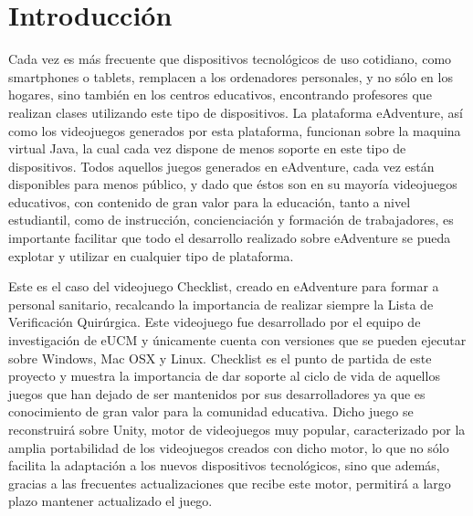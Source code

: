 
\cleardoublepage


\chapter{Introducción}
\label{introduccion}

Cada vez es más frecuente que dispositivos tecnológicos de uso cotidiano, como smartphones o tablets, remplacen a los ordenadores personales, y no sólo en los hogares, sino también en los centros educativos, encontrando profesores que realizan clases utilizando este tipo de dispositivos. La plataforma eAdventure, así como los videojuegos generados por esta plataforma, funcionan sobre la maquina virtual Java, la cual cada vez dispone de menos soporte en este tipo de dispositivos. Todos aquellos juegos generados en eAdventure, cada vez están disponibles para menos público, y dado que éstos son en su mayoría videojuegos educativos, con contenido de gran valor para la educación, tanto a nivel estudiantil, como de instrucción, concienciación y formación de trabajadores, es importante facilitar que todo el desarrollo realizado sobre eAdventure se pueda explotar y utilizar en cualquier tipo de plataforma.

Este es el caso del videojuego Checklist, creado en eAdventure para formar a personal sanitario, recalcando la importancia de realizar siempre la Lista de Verificación Quirúrgica. Este videojuego fue desarrollado por el equipo de investigación de eUCM y únicamente cuenta con versiones que se pueden ejecutar sobre Windows, Mac OSX y Linux. Checklist es el punto de partida de este proyecto y muestra la importancia de dar soporte al ciclo de vida de aquellos juegos que han dejado de ser mantenidos por sus desarrolladores ya que es conocimiento de gran valor para la comunidad educativa. Dicho juego se reconstruirá sobre Unity, motor de videojuegos muy popular, caracterizado por la amplia portabilidad de los videojuegos creados con dicho motor, lo que no sólo facilita la adaptación a los nuevos dispositivos tecnológicos, sino que además, gracias a las frecuentes actualizaciones que recibe este motor, permitirá a largo plazo mantener actualizado el juego.

